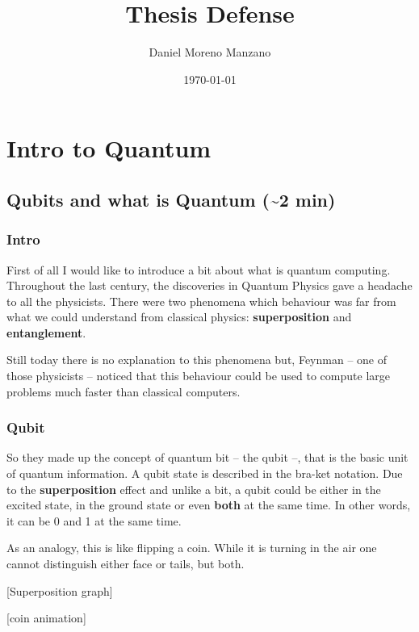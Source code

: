 \documentclass[11pt]{article}
\author{Daniel Moreno Manzano}
\date{\today}
\title{Thesis Defense}
\begin{document}
\maketitle
\tableofcontents




\section{Intro to Quantum}
\label{sec:org47caaa5}

\subsection{Qubits and what is Quantum (\textasciitilde{}2 min)}
\label{sec:orga338936}

\subsubsection{Intro}
\label{sec:org84e281f}

First of all I would like to introduce a bit about what is quantum computing.
Throughout the last century, the discoveries in Quantum Physics gave a headache to all the physicists.
There were two phenomena which behaviour was far from what we could understand from classical physics: \textbf{superposition} and \textbf{entanglement}.

Still today there is no explanation to this phenomena but, Feynman -- one of those physicists -- noticed that this behaviour could be used to compute large problems much faster than classical computers.

\subsubsection{Qubit}
\label{sec:orgf7838a3}

So they made up the concept of quantum bit -- the qubit --, that is the basic unit of quantum information.
A qubit state is described in the bra-ket notation.
Due to the \textbf{superposition} effect and unlike a bit, a qubit could be either in the excited state, in the ground state or even \textbf{both} at the same time.
In other words, it can be 0 and 1 at the same time.

As an analogy, this is like flipping a coin.
While it is turning in the air one cannot distinguish either face or tails, but both.

[Superposition graph]

[coin animation]
\end{document}
